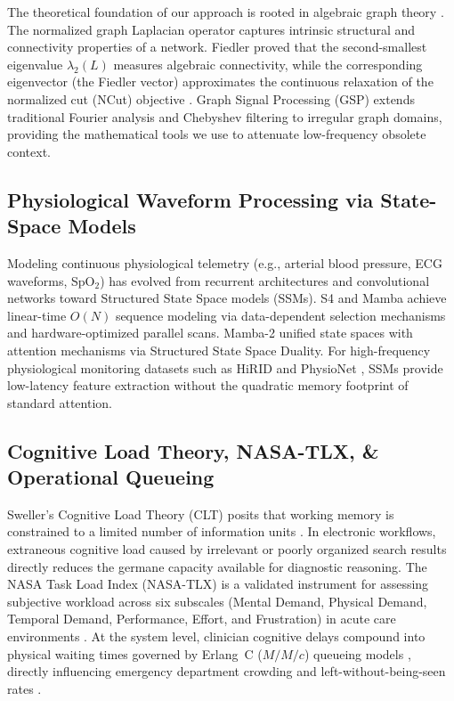 \documentclass[10pt, onecolumn]{article}
\begin{document}
The theoretical foundation of our approach is rooted in algebraic graph theory \cite{fiedler1973algebraic,fiedler1975property,chung1997spectral}. The normalized graph Laplacian operator captures intrinsic structural and connectivity properties of a network. Fiedler proved that the second-smallest eigenvalue $\lambda_2(L)$ measures algebraic connectivity, while the corresponding eigenvector (the Fiedler vector) approximates the continuous relaxation of the normalized cut (NCut) objective \cite{shi2000normalized,spielman2007spectral,von2007tutorial}. Graph Signal Processing (GSP) \cite{shuman2013emerging,ortega2018graph,sandryhaila2013discrete} extends traditional Fourier analysis and Chebyshev filtering to irregular graph domains, providing the mathematical tools we use to attenuate low-frequency obsolete context.

\subsection{Physiological Waveform Processing via State-Space Models}

Modeling continuous physiological telemetry (e.g., arterial blood pressure, ECG waveforms, SpO$_2$) has evolved from recurrent architectures \cite{hochreiter1997long} and convolutional networks toward Structured State Space models (SSMs). S4 \cite{gu2022s4} and Mamba \cite{gu2023mamba} achieve linear-time $O(N)$ sequence modeling via data-dependent selection mechanisms and hardware-optimized parallel scans. Mamba-2 \cite{dao2024mamba2} unified state spaces with attention mechanisms via Structured State Space Duality. For high-frequency physiological monitoring datasets such as HiRID \cite{hyland2020hirid} and PhysioNet \cite{goldberger2000physionet,reyna2020early}, SSMs provide low-latency feature extraction without the quadratic memory footprint of standard attention.

\subsection{Cognitive Load Theory, NASA-TLX, \& Operational Queueing}

Sweller's Cognitive Load Theory (CLT) \cite{sweller1988cognitive,sweller2019cognitive,paas1994variability} posits that working memory is constrained to a limited number of information units \cite{miller1956magical}. In electronic workflows, extraneous cognitive load caused by irrelevant or poorly organized search results directly reduces the germane capacity available for diagnostic reasoning. The NASA Task Load Index (NASA-TLX) \cite{hart1988development} is a validated instrument for assessing subjective workload across six subscales (Mental Demand, Physical Demand, Temporal Demand, Performance, Effort, and Frustration) in acute care environments \cite{tubbs2020balancing,harry2018cognitive}. At the system level, clinician cognitive delays compound into physical waiting times governed by Erlang~C ($M/M/c$) queueing models \cite{erlang1917solution,kleinrock1975queueing,gross2008fundamentals}, directly influencing emergency department crowding and left-without-being-seen rates \cite{armony2015patient,singer2011crowding,wiler2010optimizing}.
\end{document}
